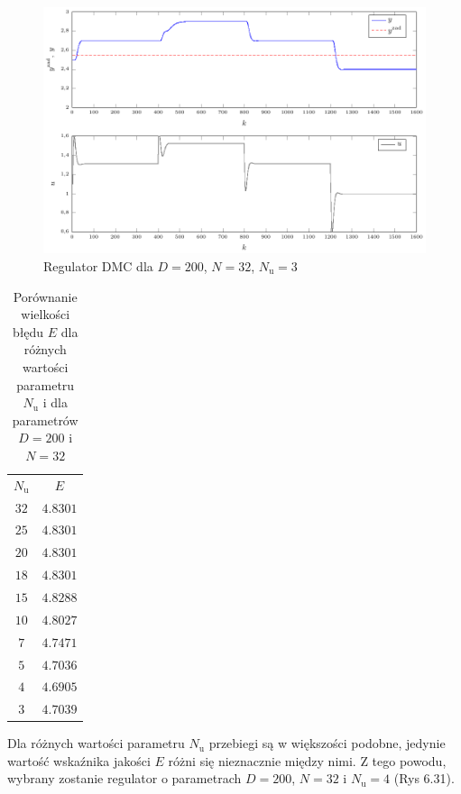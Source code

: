 \begin{figure}[tb] 
\centering 
\includegraphics[scale=1]{rysunki/zapisz_pdf/DMC_D=200.000_N=32.00_Nu=3.00.pdf} 
\caption{Regulator DMC dla $D=200$, $N=32$, $N_{\mathrm{u}}=3$} 
\label{r_pgfplots_DMC_D=200.000_N=32.00_Nu=3.00} 
\end{figure}


\begin{table}
	[b] \caption{Porównanie wielkości błędu $E$ dla różnych wartości parametru $N_{\mathrm{u}}$ i dla parametrów $D=200$ i $N=32$}
	\label{t_T_i}
	\centering
	\begin{small}
		\begin{tabular}{|c|c|}
			\hline
			$N_{\mathrm{u}}$	&	$E$	\\
			$32$	&	$\num{4.8301}$		\\
			$25$ 	&	$\num{4.8301}$		\\
			$20$ 	&	$\num{4.8301}$ 		\\
			$18$ 	&	$\num{4.8301}$		\\
			$15$	&	$\num{4.8288}$	\\
			$10$	&	$\num{4.8027}$	\\
			$7$		&	$\num{4.7471}$	\\
			$5$		&	$\num{4.7036}$	\\
			$4$		&	$\num{4.6905}$	\\
			$3$		&	$\num{4.7039}$	\\
			\hline
			\end{tabular}
	\end{small}
\end{table}


Dla różnych wartości parametru $N_{\mathrm{u}}$ przebiegi są w większości podobne, jedynie wartość wskaźnika jakości $E$ różni się nieznacznie między nimi. Z tego powodu, wybrany zostanie regulator o parametrach $D=200$, $N=32$ i $N_{\mathrm{u}}=4$ (Rys 6.31).
